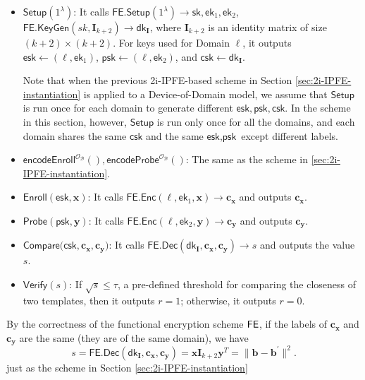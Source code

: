 \begin{itemize}

	\item $\textsf{Setup}(1^\lambda)$: It calls $\textsf{FE.Setup}(1^\lambda) \to \textsf{sk}, \textsf{ek}_1, \textsf{ek}_2$, $\textsf{FE.KeyGen}(sk, \mathbf{I}_{k+2}) \to \textsf{dk}_{\mathbf{I}} $, where $\mathbf{I}_{k+2}$ is an identity matrix of size $(k+2) \times (k+2)$. For keys used for \textsf{Domain} $\ell$, it outputs $\textsf{esk} \gets (\ell, \textsf{ek}_1)$, $\textsf{psk} \gets (\ell, \textsf{ek}_2)$, and $\textsf{csk} \gets \textsf{dk}_{\mathbf{I}}$.

	Note that when the previous 2i-IPFE-based scheme in Section \ref{sec:2i-IPFE-instantiation} is applied to a Device-of-Domain model, we assume that $\textsf{Setup}$ is run once for each domain to generate different $\textsf{esk}, \textsf{psk}, \textsf{csk}$. In the scheme in this section, however, $\textsf{Setup}$ is run only once for all the domains, and each domain shares the same $\textsf{csk}$ and the same $\textsf{esk}, \textsf{psk}$ except different labels.

	\item $\textsf{encodeEnroll}^{\mathcal{O}_{\mathcal{B}}}(), \textsf{encodeProbe}^{\mathcal{O}_{\mathcal{B}}}()$: The same as the scheme in \ref{sec:2i-IPFE-instantiation}. 

	\item $\textsf{Enroll}(\textsf{esk}, \mathbf{x})$: It calls $\textsf{FE.Enc}(\ell, \textsf{ek}_1, \mathbf{x}) \to \mathbf{c_x}$ and outputs $\mathbf{c_x}$.

	\item $\textsf{Probe}(\textsf{psk}, \mathbf{y})$: It calls $\textsf{FE.Enc}(\ell, \textsf{ek}_2, \mathbf{y}) \to \mathbf{c_y}$ and outputs $\mathbf{c_y}$.

	\item $\textsf{Compare}(\textsf{csk}, \mathbf{c_x}, \mathbf{c_y)}$: It calls $\textsf{FE.Dec}(\textsf{dk}_{\mathbf{I}}, \mathbf{c_x}, \mathbf{c_y}) \to s$ and outputs the value $s$.

	\item $\textsf{Verify}(s)$: If $\sqrt{s} \leq \tau$, a pre-defined threshold for comparing the closeness of two templates, then it outputs $r = 1$; otherwise, it outputs $r = 0$.

\end{itemize}

By the correctness of the functional encryption scheme $\sf FE$, if the labels of $\mathbf{c_x}$ and $\mathbf{c_y}$ are the same (they are of the same domain), we have
\[
	s = \textsf{FE.Dec}(\textsf{dk}_{\mathbf{I}}, \mathbf{c_x}, \mathbf{c_y}) =  \mathbf{x} \mathbf{I}_{k+2} \mathbf{y}^T = \| \mathbf{b} - \mathbf{b}^\prime \|^2.
\]
just as the scheme in Section \ref{sec:2i-IPFE-instantiation}

